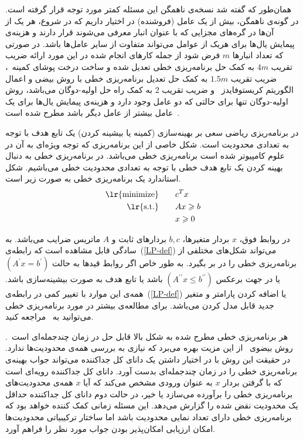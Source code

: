 همان‌طور که گفته شد نسخه‌ی ناهمگن این مسئله کمتر مورد توجه قرار گرفته است. در گونه‌ی ناهمگن، بیش از یک عامل (فروشنده) در اختیار داریم که در شروع، هر یک از آن‌ها در گره‌های مجزایی که با عنوان انبار معرفی می‌شوند قرار دارند و هزینه‌ی پیمایش یال‌ها برای هریک از عوامل می‌تواند متفاوت از سایر عامل‌ها باشد. در صورتی که تعداد انبارها $m$ فرض شود از جمله کارهای انجام شده در این مورد ارائه ضریب تقریب $4m$ به کمک حل برنامه‌ریزی خطی تعدیل شده  و ساخت درخت پوشای کمینه~\cite{4m}، ضریب تقریب $1.5m$ به کمک حل تعدیل برنامه‌ریزی خطی با روش بیضی و اعمال الگوریتم کریستوفایدز~\cite{1.5m} و ضریب تقریب 2 به کمک راه حل اولیه-دوگان می‌باشد، روش اولیه-دوگان تنها برای حالتی که دو عامل وجود دارد و هزینه‌ی پیمایش یال‌ها برای یک عامل بیشتر از عامل دیگر باشد مطرح شده است~\cite{Primal_Dual}.






در برنامه‌ریزی‌ ریاضی سعی بر بهینه‌سازی (کمینه یا بیشینه کردن) یک
 تابع هدف با توجه به تعدادی محدودیت است. شکل خاصی از این برنامه‌ریزی که توجه ويژه‌ای به آن در علوم کامپیوتر شده است برنامه‌ریزی خطی می‌باشد. در برنامه‌ریزی خطی به دنبال بهینه کردن یک تابع هدف خطی با توجه به تعدادی محدودیت خطی می‌باشیم. شکل استاندارد یک برنامه‌ریزی خطی به صورت زیر است.
\begin{alignat}{3}
\text{\lr{minimize}}   & \quad &&  c^T x       \label{LP-def}  \\
\text{\lr{s.t.}}           & &&  Ax \geq b   \notag           \\
                       	& &&   x \geq 0     \notag 
\end{alignat}

در روابط فوق، $x$ بردار متغیرها،  $b, c$ بردارهای ثابت و $A$ ماتریس ضرایب می‌باشد. به سادگی قابل مشاهده است که رابطه‌ی~(\ref{LP-def}) می‌تواند شکل‌های مختلفی از برنامه‌ریزی خطی را در بر بگیرد. به طور خاص اگر روابط قید‌ها به حالت $(A^\prime x=b^ \prime)$ یا در جهت برعکس $(A^{\prime\prime} x \leq b^{\prime\prime} )$ باشد یا تابع هدف به صورت بیشینه‌سازی باشد. همه‌ی این موارد با تغییر کمی در رابطه‌ی~(\ref{LP-def}) یا اضافه کردن پارامتر و متغیر جدید قابل مدل کردن می‌باشد. برای مطالعه‌ی بیشتر در مورد برنامه‌ریزی خطی می‌توانید به~\cite{Sch86}  مراجعه کنید.

هر برنامه‌ریزی خطی مطرح شده به شکل بالا قابل حل در زمان چندجمله‌ای است~\cite{Kha79,Kar84}. روش بیضوی~\cite{Kha79} از این مزیت بهره می‌برد که نیازی به بررسی همه‌ی محدودیت‌ها ندارد. در حقیقت این روش با در اختیار داشتن یک دانای کل جداکننده می‌تواند جواب بهینه‌ی برنامه‌ریزی خطی را در زمان چندجمله‌ای بدست آورد. دانای کل جداکننده رویه‌ای است که با گرفتن بردار $x$ به عنوان ورودی مشخص می‌کند که آیا $x$ همه‌ی محدودیت‌های برنامه‌ریزی خطی را برآورده می‌سازد یا خیر‌، در حالت دوم دانای کل جداکننده حداقل یک محدودیت نقض شده را گزارش می‌دهد. این مسئله زمانی کمک کننده خواهد بود که برنامه‌ریزی خطی دارای تعداد نمایی محدودیت باشد اما ساختار ترکیبیاتی محدودیت‌ها امکان ارزیابی امکان‌پذیر بودن جواب مورد نظر را فراهم آورد.

